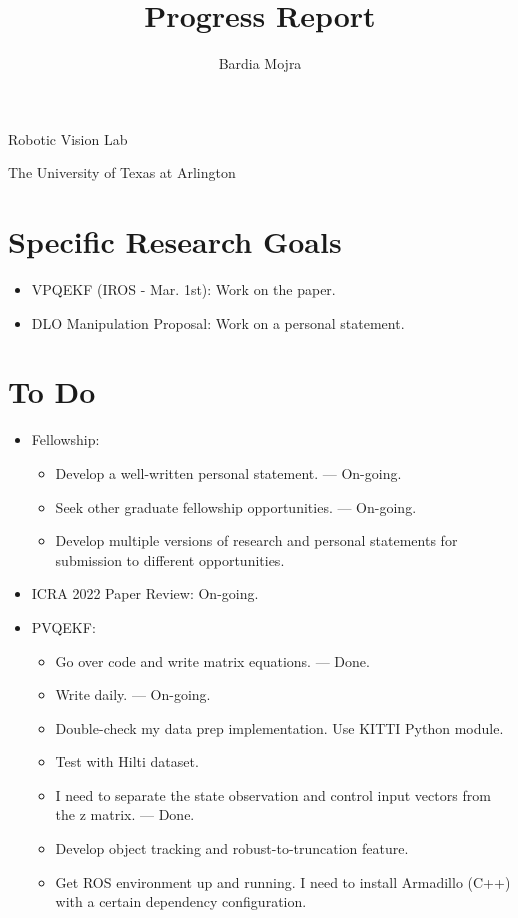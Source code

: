\documentclass[11pt]{article}
\title{Progress Report}
\author{Bardia Mojra}
\begin{document}
\maketitle
\thispagestyle{empty}

\bigskip
\bigskip
\begin{center}
      Robotic Vision Lab
\end{center}

\begin{center}
      The University of Texas at Arlington
\end{center}

\newpage

\section{Specific Research Goals}
\begin{itemize}
      \item VPQEKF (IROS - Mar. 1st): Work on the paper.
      \item DLO Manipulation Proposal: Work on a personal statement.
\end{itemize}

\section{To Do}
\begin{itemize}
  \item Fellowship:
  \begin{itemize}
      \item Develop a well-written personal statement. --- On-going.
      \item Seek other graduate fellowship opportunities. --- On-going.
      \item Develop multiple versions of research and personal statements for
      submission to different opportunities.
  \end{itemize}
  \item ICRA 2022 Paper Review: On-going.
  \item PVQEKF:
  \begin{itemize}
      \item Go over code and write matrix equations. --- Done.
      \item Write daily. --- On-going.
      \item Double-check my data prep implementation. Use KITTI Python module.
      \item Test with Hilti dataset.
      \item I need to separate the state observation and control input vectors from the z matrix. --- Done.
      \item Develop object tracking and robust-to-truncation feature.
      \item Get ROS environment up and running. I need to install Armadillo (C++) with a certain dependency configuration.
  \end{itemize}
\end{itemize}
\end{document}
